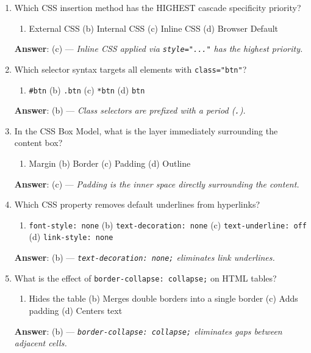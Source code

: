 \begin{enumerate}[leftmargin=1.5em]
    \item Which CSS insertion method has the HIGHEST cascade specificity priority?
    \begin{enumerate}[label=(\alph*)]
        \item External CSS \quad (b) Internal CSS \quad (c) Inline CSS \quad (d) Browser Default
    \end{enumerate}
    \textbf{Answer}: (c) --- \textit{Inline CSS applied via \texttt{style="..."} has the highest priority.}

    \item Which selector syntax targets all elements with \texttt{class="btn"}?
    \begin{enumerate}[label=(\alph*)]
        \item \texttt{\#btn} \quad (b) \texttt{.btn} \quad (c) \texttt{*btn} \quad (d) \texttt{btn}
    \end{enumerate}
    \textbf{Answer}: (b) --- \textit{Class selectors are prefixed with a period (\texttt{.}).}

    \item In the CSS Box Model, what is the layer immediately surrounding the content box?
    \begin{enumerate}[label=(\alph*)]
        \item Margin \quad (b) Border \quad (c) Padding \quad (d) Outline
    \end{enumerate}
    \textbf{Answer}: (c) --- \textit{Padding is the inner space directly surrounding the content.}

    \item Which CSS property removes default underlines from hyperlinks?
    \begin{enumerate}[label=(\alph*)]
        \item \texttt{font-style: none} \quad (b) \texttt{text-decoration: none} \quad (c) \texttt{text-underline: off} \quad (d) \texttt{link-style: none}
    \end{enumerate}
    \textbf{Answer}: (b) --- \textit{\texttt{text-decoration: none;} eliminates link underlines.}

    \item What is the effect of \texttt{border-collapse: collapse;} on HTML tables?
    \begin{enumerate}[label=(\alph*)]
        \item Hides the table \quad (b) Merges double borders into a single border \quad (c) Adds padding \quad (d) Centers text
    \end{enumerate}
    \textbf{Answer}: (b) --- \textit{\texttt{border-collapse: collapse;} eliminates gaps between adjacent cells.}


\end{enumerate}
